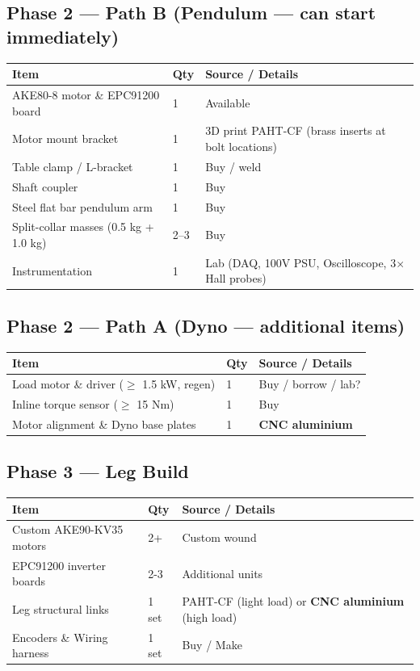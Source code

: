 \documentclass[11pt]{article}
\begin{document}
\subsection*{Phase 2 — Path B (Pendulum — can start immediately)}
\noindent
\begin{tabularx}{\textwidth}{@{}l l X@{}}
\toprule
\textbf{Item} & \textbf{Qty} & \textbf{Source / Details} \\
\midrule
AKE80-8 motor \& EPC91200 board & 1 & Available \\
Motor mount bracket & 1 & 3D print PAHT-CF (brass inserts at bolt locations) \\
Table clamp / L-bracket & 1 & Buy / weld \\
Shaft coupler & 1 & Buy \\
Steel flat bar pendulum arm & 1 & Buy \\
Split-collar masses (0.5 kg + 1.0 kg) & 2–3 & Buy \\
Instrumentation & 1 & Lab (DAQ, 100V PSU, Oscilloscope, 3$\times$ Hall probes) \\
\bottomrule
\end{tabularx}

\subsection*{Phase 2 — Path A (Dyno — additional items)}
\noindent
\begin{tabularx}{\textwidth}{@{}l l X@{}}
\toprule
\textbf{Item} & \textbf{Qty} & \textbf{Source / Details} \\
\midrule
Load motor \& driver ($\geq$ 1.5 kW, regen) & 1 & Buy / borrow / lab? \\
Inline torque sensor ($\geq$ 15 Nm) & 1 & Buy \\
Motor alignment \& Dyno base plates & 1 & \textbf{CNC aluminium} \\
\bottomrule
\end{tabularx}

\subsection*{Phase 3 — Leg Build}
\noindent
\begin{tabularx}{\textwidth}{@{}l l X@{}}
\toprule
\textbf{Item} & \textbf{Qty} & \textbf{Source / Details} \\
\midrule
Custom AKE90-KV35 motors & 2+ & Custom wound \\
EPC91200 inverter boards & 2-3 & Additional units \\
Leg structural links & 1 set & PAHT-CF (light load) or \textbf{CNC aluminium} (high load) \\
Encoders \& Wiring harness & 1 set & Buy / Make \\
\bottomrule
\end{tabularx}
\end{document}
